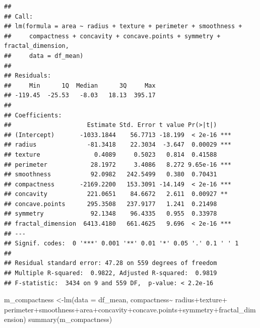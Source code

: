 \documentclass[
  11pt,
]{article}
\newenvironment{Shaded}{\begin{snugshade}}{\end{snugshade}}
\newcommand{\AttributeTok}[1]{\textcolor[rgb]{0.77,0.63,0.00}{#1}}
\newcommand{\FunctionTok}[1]{\textcolor[rgb]{0.00,0.00,0.00}{#1}}
\newcommand{\NormalTok}[1]{#1}
\newcommand{\OtherTok}[1]{\textcolor[rgb]{0.56,0.35,0.01}{#1}}
\newcommand{\SpecialCharTok}[1]{\textcolor[rgb]{0.00,0.00,0.00}{#1}}
\begin{document}
\begin{verbatim}
## 
## Call:
## lm(formula = area ~ radius + texture + perimeter + smoothness + 
##     compactness + concavity + concave.points + symmetry + fractal_dimension, 
##     data = df_mean)
## 
## Residuals:
##     Min      1Q  Median      3Q     Max 
## -119.45  -25.53   -8.03   18.13  395.17 
## 
## Coefficients:
##                     Estimate Std. Error t value Pr(>|t|)    
## (Intercept)       -1033.1844    56.7713 -18.199  < 2e-16 ***
## radius              -81.3418    22.3034  -3.647  0.00029 ***
## texture               0.4089     0.5023   0.814  0.41588    
## perimeter            28.1972     3.4086   8.272 9.65e-16 ***
## smoothness           92.0982   242.5499   0.380  0.70431    
## compactness       -2169.2200   153.3091 -14.149  < 2e-16 ***
## concavity           221.0651    84.6672   2.611  0.00927 ** 
## concave.points      295.3508   237.9177   1.241  0.21498    
## symmetry             92.1348    96.4335   0.955  0.33978    
## fractal_dimension  6413.4180   661.4625   9.696  < 2e-16 ***
## ---
## Signif. codes:  0 '***' 0.001 '**' 0.01 '*' 0.05 '.' 0.1 ' ' 1
## 
## Residual standard error: 47.28 on 559 degrees of freedom
## Multiple R-squared:  0.9822, Adjusted R-squared:  0.9819 
## F-statistic:  3434 on 9 and 559 DF,  p-value: < 2.2e-16
\end{verbatim}

\begin{Shaded}
\begin{Highlighting}[]
\NormalTok{m\_compactness }\OtherTok{\textless{}{-}}\FunctionTok{lm}\NormalTok{(}\AttributeTok{data =}\NormalTok{ df\_mean, compactness}\SpecialCharTok{\textasciitilde{}}\NormalTok{ radius}\SpecialCharTok{+}\NormalTok{texture}\SpecialCharTok{+}\NormalTok{ perimeter}\SpecialCharTok{+}\NormalTok{smoothness}\SpecialCharTok{+}\NormalTok{area}\SpecialCharTok{+}\NormalTok{concavity}\SpecialCharTok{+}\NormalTok{concave.points}\SpecialCharTok{+}\NormalTok{symmetry}\SpecialCharTok{+}\NormalTok{fractal\_dimension)}
\FunctionTok{summary}\NormalTok{(m\_compactness)}
\end{Highlighting}
\end{Shaded}
\end{document}
